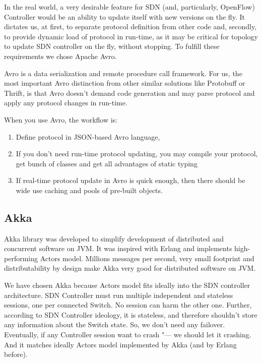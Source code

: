 \documentclass[10pt, a5paper]{article}
\begin{document}
In the real world, a very desirable feature for SDN (and, particularly, OpenFlow) Controller would be an ability to update itself with new versions on the fly. It dictates us, at first, to separate  protocol definition from other code and, secondly, to provide dynamic load of protocol in run-time, as it may be critical for topology to update SDN controller on the fly, without stopping. To fulfill these requirements we chose Apache Avro.

Avro is a data serialization and remote procedure call framework. For us, the most important Avro distinction from other similar solutions like Protobuff or Thrift, is that Avro doesn't demand code generation and may parse protocol and apply any protocol changes in run-time.

When you use Avro, the workflow is:

\begin{enumerate}
  \item Define protocol in JSON-based Avro language,
  \item If you don't need run-time protocol updating, you may compile your protocol, get bunch of classes and get all advantages of static typing
  \item If real-time protocol update in Avro is quick enough, then there should be wide use caching and pools of pre-built objects.
\end{enumerate}

\subsection*{Akka}

Akka library was developed to simplify development of distributed and concurrent software on JVM. It was inspired with Erlang and implements high-performing Actors model. Millions messages per second, very small footprint and distributability by design make Akka very good for distributed software on JVM.

We have chosen Akka because Actors model fits ideally into the SDN controller architecture. SDN Controller must run multiple independent and stateless sessions, one per connected Switch. No session can harm the other one. Further, according to SDN Controller ideology, it is stateless, and therefore shouldn't store any information about the Switch state. So, we don't need any failover. Eventually, if any Controller session want to crash "--- we should let it crashing. And it matches ideally Actors model implemented by Akka (and by Erlang before).
\end{document}
